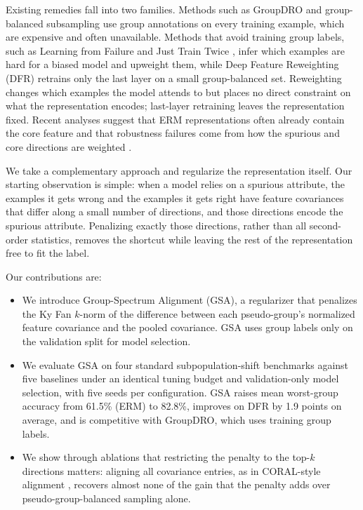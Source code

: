 \documentclass{article}
\begin{document}
Existing remedies fall into two families. Methods such as GroupDRO \citep{sagawa2020groupdro} and group-balanced subsampling \citep{idrissi2022simple} use group annotations on every training example, which are expensive and often unavailable. Methods that avoid training group labels, such as Learning from Failure \citep{nam2020lff} and Just Train Twice \citep{liu2021jtt}, infer which examples are hard for a biased model and upweight them, while Deep Feature Reweighting (DFR) \citep{kirichenko2023dfr} retrains only the last layer on a small group-balanced set. Reweighting changes which examples the model attends to but places no direct constraint on what the representation encodes; last-layer retraining leaves the representation fixed. Recent analyses suggest that ERM representations often already contain the core feature and that robustness failures come from how the spurious and core directions are weighted \citep{kirichenko2023dfr,izmailov2022feature}.

We take a complementary approach and regularize the representation itself. Our starting observation is simple: when a model relies on a spurious attribute, the examples it gets wrong and the examples it gets right have feature covariances that differ along a small number of directions, and those directions encode the spurious attribute. Penalizing exactly those directions, rather than all second-order statistics, removes the shortcut while leaving the rest of the representation free to fit the label.

Our contributions are:
\begin{itemize}
\item We introduce Group-Spectrum Alignment (GSA), a regularizer that penalizes the Ky Fan $k$-norm of the difference between each pseudo-group's normalized feature covariance and the pooled covariance. GSA uses group labels only on the validation split for model selection.
\item We evaluate GSA on four standard subpopulation-shift benchmarks against five baselines under an identical tuning budget and validation-only model selection, with five seeds per configuration. GSA raises mean worst-group accuracy from 61.5\% (ERM) to 82.8\%, improves on DFR by 1.9 points on average, and is competitive with GroupDRO, which uses training group labels.
\item We show through ablations that restricting the penalty to the top-$k$ directions matters: aligning all covariance entries, as in CORAL-style alignment \citep{sun2016coral}, recovers almost none of the gain that the penalty adds over pseudo-group-balanced sampling alone.
\end{itemize}
\end{document}

